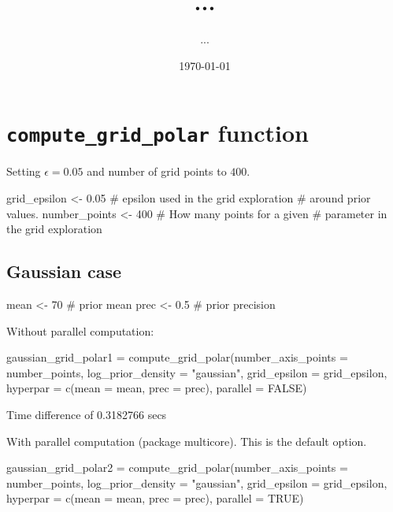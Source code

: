 \documentclass[11pt,twoside,a4paper]{article}
\title{...}
\author{...}
\date{\today}
\begin{document}
\section{\texttt{compute\_grid\_polar} function}


Setting $\epsilon = 0.05$ and number of grid points to $400$.

\begin{Schunk}
\begin{Sinput}
  grid_epsilon <- 0.05 # epsilon used in the grid exploration 
                       # around prior values.
  number_points <- 400  # How many points for a given 
                        # parameter in the grid exploration
\end{Sinput}
\end{Schunk}

\subsection{Gaussian case}

\begin{Schunk}
\begin{Sinput}
  mean <- 70  # prior mean 
  prec <- 0.5 # prior precision
  
\end{Sinput}
\end{Schunk}

\noindent Without parallel computation:
\begin{Schunk}
\begin{Sinput}
  gaussian_grid_polar1 = compute_grid_polar(number_axis_points = number_points, 
                                           log_prior_density = "gaussian",
                                           grid_epsilon = grid_epsilon,
                                           hyperpar = c(mean = mean, prec = prec),
                                           parallel = FALSE)
\end{Sinput}
\end{Schunk}
\begin{Schunk}
\begin{Soutput}
Time difference of 0.3182766 secs
\end{Soutput}
\end{Schunk}

\noindent With parallel computation (package multicore). This is the default option.
\begin{Schunk}
\begin{Sinput}
  gaussian_grid_polar2 = compute_grid_polar(number_axis_points = number_points, 
                                           log_prior_density = "gaussian",
                                           grid_epsilon = grid_epsilon,
                                           hyperpar = c(mean = mean, prec = prec),
                                           parallel = TRUE)
\end{Sinput}
\end{Schunk}
\end{document}
